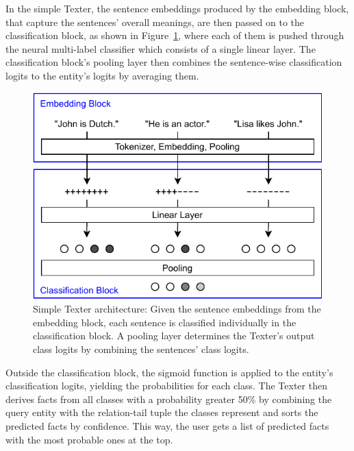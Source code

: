 In the simple Texter, the sentence embeddings produced by the embedding block, that capture the sentences' overall meanings, are then passed on to the classification block, as shown in Figure~\ref{fig:4_approach/1_texter/2_simple_model/simple_architecture}, where each of them is pushed through the neural multi-label classifier which consists of a single linear layer. The classification block's pooling layer then combines the sentence-wise classification logits to the entity's logits by averaging them.

\begin{figure}[t]
    \centering
    \includegraphics{4_approach/1_texter/2_simple_model/simple_architecture}
    \caption{Simple Texter architecture: Given the sentence embeddings from the embedding block, each sentence is classified individually in the classification block. A pooling layer determines the Texter's output class logits by combining the sentences' class logits.}
    \label{fig:4_approach/1_texter/2_simple_model/simple_architecture}
\end{figure}

Outside the classification block, the sigmoid function is applied to the entity's classification logits, yielding the probabilities for each class. The Texter then derives facts from all classes with a probability greater 50\% by combining the query entity with the relation-tail tuple the classes represent and sorts the predicted facts by confidence. This way, the user gets a list of predicted facts with the most probable ones at the top.
